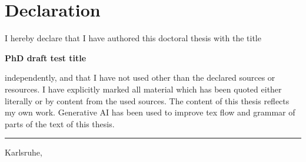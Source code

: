 
\chapter*{Declaration}


\noindent \begin{flushleft}
I hereby declare that I have authored this doctoral thesis with the title 
\par\end{flushleft}

\begin{center}
\vspace{1cm}
\textbf{%
\huge PhD draft test title
}\\
\vspace{1cm}
\par\end{center}

independently, and that I have not used other than the declared sources or resources. I have explicitly marked all material 
which has been quoted either literally or by content from the used sources. The content of this thesis reflects my own work. 
Generative AI has been used to improve tex flow and grammar of parts of the text of this thesis.


\vspace*{2cm}
\begin{minipage}[t]{0.4\columnwidth}%
\rule[0.5ex]{1\columnwidth}{1pt}

\MyAuthorName \hfill Karlsruhe, \MyDateOfDefense
\end{minipage}

\vfill
\doclicenseThis
